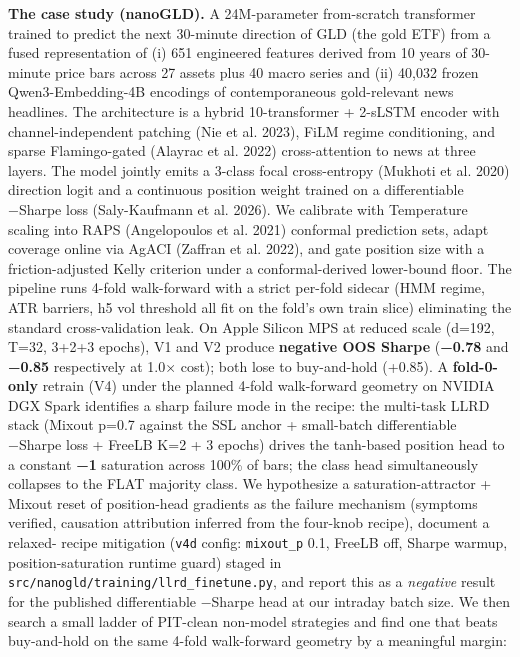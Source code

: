 \documentclass[
]{article}
\begin{document}
\textbf{The case study (nanoGLD).} A 24M-parameter from-scratch
transformer trained to predict the next 30-minute direction of GLD (the
gold ETF) from a fused representation of (i) 651 engineered features
derived from 10 years of 30-minute price bars across 27 assets plus 40
macro series and (ii) 40,032 frozen Qwen3-Embedding-4B encodings of
contemporaneous gold-relevant news headlines. The architecture is a
hybrid 10-transformer + 2-sLSTM encoder with channel-independent
patching (Nie et al. 2023), FiLM regime conditioning, and sparse
Flamingo-gated ({Alayrac et al.} 2022) cross-attention to news at three
layers. The model jointly emits a 3-class focal cross-entropy (Mukhoti
et al. 2020) direction logit and a continuous position weight trained on
a differentiable −Sharpe loss (Saly-Kaufmann et al. 2026). We calibrate
with Temperature scaling into RAPS (Angelopoulos et al. 2021) conformal
prediction sets, adapt coverage online via AgACI (Zaffran et al. 2022),
and gate position size with a friction-adjusted Kelly criterion under a
conformal-derived lower-bound floor. The pipeline runs 4-fold
walk-forward with a strict per-fold sidecar (HMM regime, ATR barriers,
h5 vol threshold all fit on the fold's own train slice) eliminating the
standard cross-validation leak. On Apple Silicon MPS at reduced scale
(d=192, T=32, 3+2+3 epochs), V1 and V2 produce \textbf{negative OOS
Sharpe} (\textbf{−0.78} and \textbf{−0.85} respectively at 1.0× cost);
both lose to buy-and-hold (+0.85). A \textbf{fold-0-only} retrain (V4)
under the planned 4-fold walk-forward geometry on NVIDIA DGX Spark
identifies a sharp failure mode in the recipe: the multi-task LLRD stack
(Mixout p=0.7 against the SSL anchor + small-batch differentiable
−Sharpe loss + FreeLB K=2 + 3 epochs) drives the tanh-based position
head to a constant \textbf{−1} saturation across 100\% of bars; the
class head simultaneously collapses to the FLAT majority class. We
hypothesize a saturation-attractor + Mixout reset of position-head
gradients as the failure mechanism (symptoms verified, causation
attribution inferred from the four-knob recipe), document a relaxed-
recipe mitigation (\texttt{v4d} config: \texttt{mixout\_p} 0.1, FreeLB
off, Sharpe warmup, position-saturation runtime guard) staged in
\texttt{src/nanogld/training/llrd\_finetune.py}, and report this as a
\emph{negative} result for the published differentiable −Sharpe head at
our intraday batch size. We then search a small ladder of PIT-clean
non-model strategies and find one that beats buy-and-hold on the same
4-fold walk-forward geometry by a meaningful margin:
\end{document}
